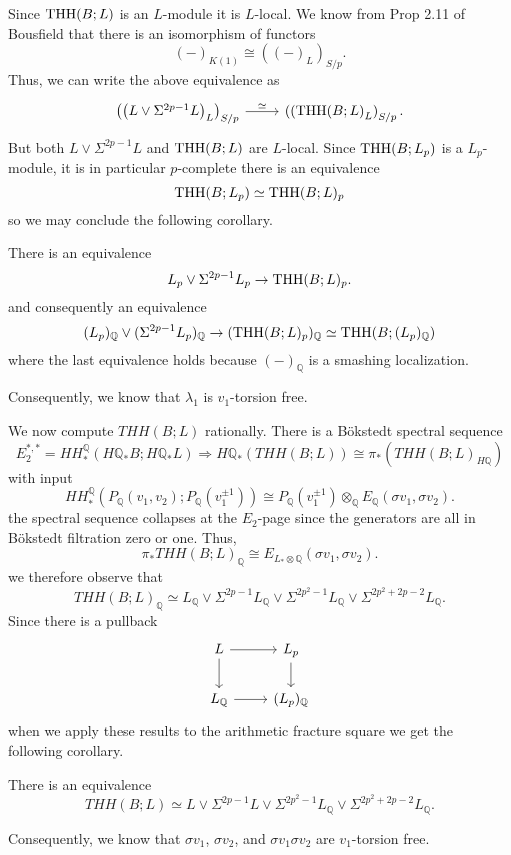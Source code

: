 Since $\operatorname{THH}(B;L)$ is an $L$-module it is $L$-local.  We know from Prop 2.11 of Bousfield that there is an isomorphism of functors
\[
(- )_{K(1)} \cong \left ( \left ( - \right )_{L} \right )_{S/p}.
\]
Thus, we can write the above equivalence as 
\[
\begin{tikzcd}
\left ( \left (L\vee \Sigma^{2p-1}L\right )_L \right )_{S/p} \arrow[r, "\simeq"] & \left ( \left (\THH(B;L\right)_L \right )_{S/p}.
\end{tikzcd}
\]
But both $L\vee \Sigma^{2p-1}L$ and $\operatorname{THH}(B;L)$ are $L$-local. Since $\operatorname{THH}(B;L_p)$ is a $L_p$-module, it is in particular $p$-complete 
 there is an equivalence 
\[ \operatorname{THH}(B;L_p)\simeq \operatorname{THH}(B;L)_p\]
so we may conclude the following corollary. 


\begin{cor}
	There is an equivalence
	\[
	L_p\vee \Sigma^{2p-1}L_p\to \operatorname{THH}(B;L)_p .
	\]
	and consequently an equivalence 
	\[
	(L_p)_{\mathbb{Q}}\vee (\Sigma^{2p-1}L_p)_{\mathbb{Q}} \to (\operatorname{THH}(B;L)_p)_{\mathbb{Q}}\simeq \operatorname{THH}(B; (L_p)_{\mathbb{Q}}) 
	\]
	where the last equivalence holds because $(-)_{\mathbb{Q}}$ is a smashing localization. 
\end{cor}

Consequently, we know that $\lambda_1$ is $v_1$-torsion free. 

We now compute $THH(B;L)$ rationally. There is a B\"okstedt spectral sequence 
\[ E_2^{*,*}=HH_*^{\mathbb{Q}}(H\mathbb{Q}_*B;H\mathbb{Q}_*L)\Rightarrow H\mathbb{Q}_*(THH(B;L))\cong \pi_*( THH(B;L)_{H\mathbb{Q}})\]
with input 
\[HH_*^{\mathbb{Q}}(P_{\mathbb{Q}}(v_1,v_2);P_{\mathbb{Q}}(v_1^{\pm 1}))\cong P_{\mathbb{Q}}(v_1^{\pm 1})\otimes_{\mathbb{Q}} E_{\mathbb{Q}}(\sigma v_1,\sigma v_2).\]
the spectral sequence collapses at the $E_2$-page since the generators are all in B\"okstedt filtration zero or one. Thus, 
\[ \pi_*THH(B;L)_{\mathbb{Q}}\cong E_{L_*\otimes \mathbb{Q}}(\sigma v_1, \sigma v_2).\]
we therefore observe that 
\[ THH(B;L)_{\mathbb{Q}} \simeq  L_{\mathbb{Q}} \vee \Sigma^{2p-1}L_{\mathbb{Q}}\vee\Sigma^{2p^2-1}L_{\mathbb{Q}}\vee\Sigma^{2p^2+2p-2} L_{\mathbb{Q}}.\]
Since there is a pullback 
\[
\begin{tikzcd}
	L \arrow[r]\arrow[d] & L_p \arrow[d]\\
	L_{\mathbb{Q}} \arrow[r] & (L_p)_{\mathbb{Q}}
\end{tikzcd}
\]
when we apply these results to the arithmetic fracture square we get the following corollary. 

\begin{cor}
There is an equivalence 
\[ THH(B;L)\simeq L\vee \Sigma^{2p-1}L\vee \Sigma^{2p^2-1}L_{\mathbb{Q}}\vee\Sigma^{2p^2+2p-2}L_{\mathbb{Q}}.\]
\end{cor}

Consequently, we know that $\sigma v_1$, $\sigma v_2$, and $\sigma v_1 \sigma v_2$ are $v_1$-torsion free.